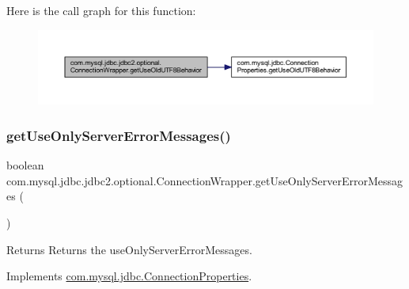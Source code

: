 Here is the call graph for this function\+:
\nopagebreak
\begin{figure}[H]
\begin{center}
\leavevmode
\includegraphics[width=350pt]{classcom_1_1mysql_1_1jdbc_1_1jdbc2_1_1optional_1_1_connection_wrapper_aab5bc3ee546eb81a0fd5a28b576f6338_cgraph}
\end{center}
\end{figure}
\mbox{\label{classcom_1_1mysql_1_1jdbc_1_1jdbc2_1_1optional_1_1_connection_wrapper_a0d102be23b8a849c3ffbc2412ee20615}} 
\subsubsection{\texorpdfstring{get\+Use\+Only\+Server\+Error\+Messages()}{getUseOnlyServerErrorMessages()}}
{\footnotesize\ttfamily boolean com.\+mysql.\+jdbc.\+jdbc2.\+optional.\+Connection\+Wrapper.\+get\+Use\+Only\+Server\+Error\+Messages (\begin{DoxyParamCaption}{ }\end{DoxyParamCaption})}

\begin{DoxyReturn}{Returns}
Returns the use\+Only\+Server\+Error\+Messages. 
\end{DoxyReturn}


Implements \mbox{\hyperlink{interfacecom_1_1mysql_1_1jdbc_1_1_connection_properties_ae8e53bc10eb54dfdc635c30ff5efca90}{com.\+mysql.\+jdbc.\+Connection\+Properties}}.

